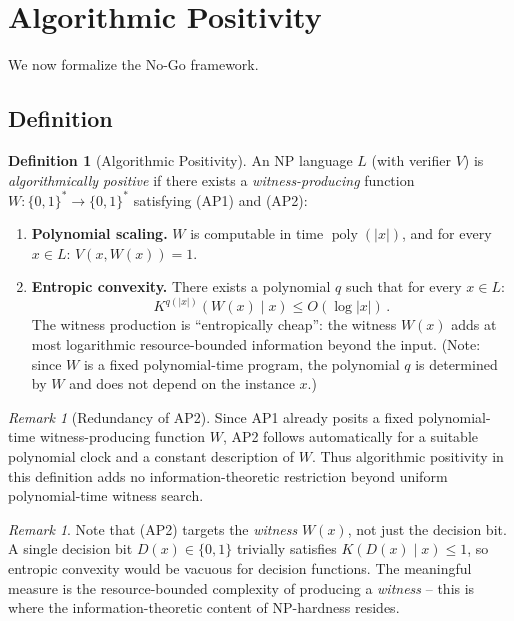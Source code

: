 \documentclass[aps,prd,twocolumn,superscriptaddress,nofootinbib]{revtex4-2}
\theoremstyle{definition}
\newtheorem{definition}[theorem]{Definition}
\theoremstyle{remark}
\newtheorem{remark}[theorem]{Remark}
\DeclareMathOperator{\poly}{poly}
\begin{document}
\section{Algorithmic Positivity}
\label{sec:positivity}

We now formalize the No-Go framework.

\subsection{Definition}

\begin{definition}[Algorithmic Positivity]
\label{def:alg_pos}
An NP language $L$ (with verifier $V$) is \textit{algorithmically positive} if there exists a \textit{witness-producing} function $W: \{0,1\}^* \to \{0,1\}^*$ satisfying (AP1) and (AP2):

\begin{enumerate}
\item[\textbf{(AP1)}] \textbf{Polynomial scaling.} $W$ is computable in time $\poly(|x|)$, and for every $x \in L$: $V(x, W(x)) = 1$.

\item[\textbf{(AP2)}] \textbf{Entropic convexity.} There exists a polynomial $q$ such that for every $x \in L$:
\begin{equation}
K^{q(|x|)}(W(x) \mid x) \leq O(\log|x|)\,.
\end{equation}
The witness production is ``entropically cheap'': the witness $W(x)$ adds at most logarithmic resource-bounded information beyond the input. (Note: since $W$ is a fixed polynomial-time program, the polynomial $q$ is determined by $W$ and does not depend on the instance $x$.)
\end{enumerate}
\end{definition}

\begin{remark}[Redundancy of AP2]
Since AP1 already posits a fixed polynomial-time witness-producing function $W$, AP2 follows automatically for a suitable polynomial clock and a constant description of $W$. Thus algorithmic positivity in this definition adds no information-theoretic restriction beyond uniform polynomial-time witness search.
\end{remark}

\begin{remark}
Note that (AP2) targets the \textit{witness} $W(x)$, not just the decision bit. A single decision bit $D(x) \in \{0,1\}$ trivially satisfies $K(D(x) \mid x) \leq 1$, so entropic convexity would be vacuous for decision functions. The meaningful measure is the resource-bounded complexity of producing a \textit{witness} -- this is where the information-theoretic content of NP-hardness resides.
\end{remark}
\end{document}
